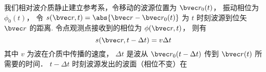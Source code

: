 

我们相对波介质静止建立参考系，令移动的波源位置为 $\bvec r_0(t)$， 振动相位为 $\phi_0(t)$， 令 $s(\bvec r, t) = \abs{\bvec r - \bvec r_0(t)}$ 为 $t$ 时刻波源到位矢 $\bvec r$ 的距离. 令点观测点接收到的相位为 $\phi(\bvec r, t)$， 则有
\begin{equation}
s(\bvec r, t - \Delta t) = v\Delta t
\end{equation}
其中 $v$ 为波在介质中传播的速度， $\Delta t$ 是波从 $\bvec r_0(t - \Delta t)$ 传到 $\bvec r(t)$ 所需要的时间． $t - \Delta t$ 时刻波源发出的波面（相位不变）在
